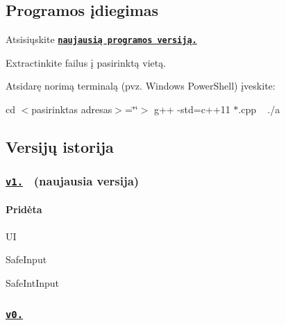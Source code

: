   

\subsection*{Programos įdiegimas}


\begin{DoxyEnumerate}
\item Atsisiųskite \href{https://github.com/BlackDude22/AntraUzduotis/releases}{\tt {\bfseries naujausią programos versiją.}}~\newline

\item Extract\textquotesingle{}inkite failus į pasirinktą vietą.
\item Atsidarę norimą terminalą (pvz. Windows Power\+Shell) įveskite\+:

cd $<$pasirinktas adresas$>$=\char`\"{}\char`\"{}$>$ g++ -\/std=c++11 $\ast$.cpp ~\newline
 ./a
\end{DoxyEnumerate}

\subsection*{Versijų istorija}

\subsubsection*{\href{https://github.com/BlackDude22/AntraUzduotis/releases/tag/v1.0}{\tt {\bfseries v1.}}~\newline
(naujausia versija)}

\paragraph*{Pridėta}


\begin{DoxyEnumerate}
\item UI
\item Safe\+Input
\item Safe\+Int\+Input
\end{DoxyEnumerate}

\subsubsection*{\href{https://github.com/BlackDude22/AntraUzduotis/releases/tag/v0.5}{\tt {\bfseries v0.}}~\newline
}


